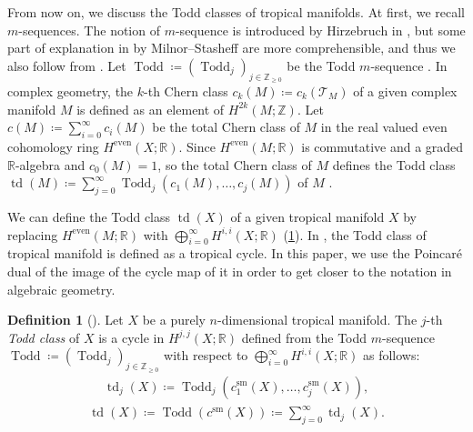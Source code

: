 \documentclass[a4paper,dvipdfmx,reqno,12pt]{amsart}
\theoremstyle{definition}
\newtheorem{definition}[theorem]{Definition}
\newcommand{\deq}{\coloneqq}
\newcommand{\opn}[1]{\operatorname{#1}}
\numberwithin{equation}{section}
\begin{document}
From now on, we discuss the Todd classes of
tropical manifolds.
At first, we recall $m$-sequences.
The notion of $m$-sequence is introduced
by Hirzebruch in \cite[]{MR1335917},
but some part of explanation in
\cite[]{MR440554}
by Milnor--Stasheff are more comprehensible,
and thus we also follow from \cite[]{MR440554}.
Let $\opn{Todd}\deq 
(\opn{Todd}_j)_{j\in \mathbb{Z}_{\geq 0}}$ be 
the Todd $m$-sequence \cite[]{MR1335917}.
In complex geometry, the $k$-th Chern class
$c_k(M)\deq c_k(\mathcal{T}_M)$ of
a given complex manifold $M$ is defined
as an element of $H^{2k}(M;\mathbb{Z})$.
Let $c(M)\deq \sum_{i=0}^{\infty}c_i(M)$ be
the total Chern class of $M$
in the real valued
even cohomology ring $H^{\mathrm{even}}(X;\mathbb{R})$.
Since $H^{\mathrm{even}}(M;\mathbb{R})$
is commutative and a graded $\mathbb{R}$-algebra
and $c_0(M)=1$,
so the total Chern class of $M$ defines 
the Todd class $\opn{td}(M)\deq \sum_{j=0}^{\infty}
\opn{Todd}_j(c_{1}(M),\ldots,c_{j}(M))$ of $M$
\cite[]{MR1335917}.
 
We can define the Todd class
$\opn{td}(X)$ of a given tropical manifold
$X$ by replacing 
$H^{\mathrm{even}}(M;\mathbb{R})$ with
$\bigoplus_{i=0}^{\infty} H^{i,i}(X;\mathbb{R})$
(\cref{definition-tropical-todd}).
In \cite[Conjecture 6.13]{demedrano2023chern},
the Todd class of tropical manifold is
defined as a tropical cycle.
In this paper, we use the Poincar\'e dual of the image 
of the cycle map of it
in order to get closer to the notation 
in algebraic geometry.

\begin{definition}[{\cite[]{demedrano2023chern}}]
\label{definition-tropical-todd}
Let $X$ be a purely $n$-dimensional tropical manifold.
The $j$-th \emph{Todd class} of $X$ is
a cycle in $H^{j,j}(X;\mathbb{R})$
defined from 
the Todd $m$-sequence 
$\opn{Todd}\deq (\opn{Todd}_j)_{j\in \mathbb{Z}_{\geq 0}}$
with respect to $\bigoplus_{i=0}^{\infty}
H^{i,i}(X;\mathbb{R})$ as follows:
\begin{align}
\opn{td}_j(X)\deq \opn{Todd}_j(c_{1}^{\mathrm{sm}}(X),
\ldots,c_{j}^{\mathrm{sm}}(X)),
\end{align}
\begin{align}
\opn{td}(X)\deq
\opn{Todd}(c^{\mathrm{sm}}(X))\deq
\sum_{j=0}^{\infty}\opn{td}_j(X).
\end{align}

\end{definition}
\end{document}
